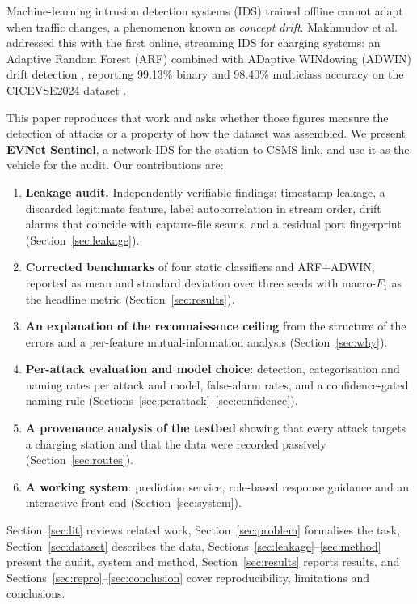 \documentclass[conference]{IEEEtran}
\begin{document}
Machine-learning intrusion detection systems (IDS) trained offline cannot adapt when traffic changes, a phenomenon known as \emph{concept drift}. Makhmudov et al.\ \cite{b4} addressed this with the first online, streaming IDS for charging systems: an Adaptive Random Forest (ARF) \cite{b6} combined with ADaptive WINdowing (ADWIN) drift detection \cite{b7}, reporting 99.13\% binary and 98.40\% multiclass accuracy on the CICEVSE2024 dataset \cite{b8}.

This paper reproduces that work and asks whether those figures measure the detection of attacks or a property of how the dataset was assembled. We present \textbf{EVNet Sentinel}, a network IDS for the station-to-CSMS link, and use it as the vehicle for the audit. Our contributions are:

\begin{enumerate}
    \item \textbf{Leakage audit.} Independently verifiable findings: timestamp leakage, a discarded legitimate feature, label autocorrelation in stream order, drift alarms that coincide with capture-file seams, and a residual port fingerprint (Section~\ref{sec:leakage}).
    \item \textbf{Corrected benchmarks} of four static classifiers and ARF+ADWIN, reported as mean and standard deviation over three seeds with macro-$F_1$ as the headline metric (Section~\ref{sec:results}).
    \item \textbf{An explanation of the reconnaissance ceiling} from the structure of the errors and a per-feature mutual-information analysis (Section~\ref{sec:why}).
    \item \textbf{Per-attack evaluation and model choice}: detection, categorisation and naming rates per attack and model, false-alarm rates, and a confidence-gated naming rule (Sections~\ref{sec:perattack}--\ref{sec:confidence}).
    \item \textbf{A provenance analysis of the testbed} showing that every attack targets a charging station and that the data were recorded passively (Section~\ref{sec:routes}).
    \item \textbf{A working system}: prediction service, role-based response guidance and an interactive front end (Section~\ref{sec:system}).
\end{enumerate}

Section~\ref{sec:lit} reviews related work, Section~\ref{sec:problem} formalises the task, Section~\ref{sec:dataset} describes the data, Sections~\ref{sec:leakage}--\ref{sec:method} present the audit, system and method, Section~\ref{sec:results} reports results, and Sections~\ref{sec:repro}--\ref{sec:conclusion} cover reproducibility, limitations and conclusions.
\end{document}
